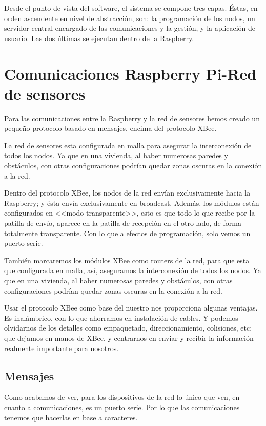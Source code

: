 Desde el punto de vista del software, el sistema se compone tres capas. Éstas, en orden ascendente en nivel de abstracción, son: la programación de los nodos, un servidor central encargado de las comunicaciones y la gestión, y la aplicación de usuario. Las dos últimas se ejecutan dentro de la Raspberry.

\section{Comunicaciones Raspberry Pi-Red de sensores}
Para las comunicaciones entre la Raspberry y la red de sensores hemos creado un pequeño protocolo basado en mensajes, encima del protocolo XBee. 

La red de sensores esta configurada en  malla para asegurar la interconexión de todos los nodos. Ya que en una vivienda, al haber numerosas paredes y obstáculos, con otras configuraciones podrían quedar zonas oscuras en la conexión a la red.

Dentro del protocolo XBee, los nodos de la red envían exclusivamente hacia la Raspberry; y ésta envía exclusivamente en broadcast. Además, los módulos están configurados en <<modo transparente>>, esto es que todo lo que recibe por la patilla de envío, aparece en la patilla de recepción en el otro lado, de forma totalmente transparente. Con lo que a efectos de programación, solo vemos un puerto serie. 

También marcaremos los módulos XBee como routers de la red, para que esta que configurada en malla, así, aseguramos la interconexión de todos los nodos. Ya que en una vivienda, al haber numerosas paredes y obstáculos, con otras configuraciones podrían quedar zonas oscuras en la conexión a la red.


Usar el protocolo XBee como base del nuestro nos proporciona algunas ventajas. Es inalámbrico, con lo que ahorramos en instalación de cables. Y podemos olvidarnos de los detalles como empaquetado, direccionamiento, colisiones, etc; que dejamos en manos de XBee, y centrarnos en enviar y recibir la información realmente importante para nosotros.

\subsection{Mensajes}
Como acabamos de ver, para los dispositivos de la red lo único que ven, en cuanto a comunicaciones,  es un puerto serie. Por lo que las comunicaciones tenemos que hacerlas en base a caracteres. 
 

